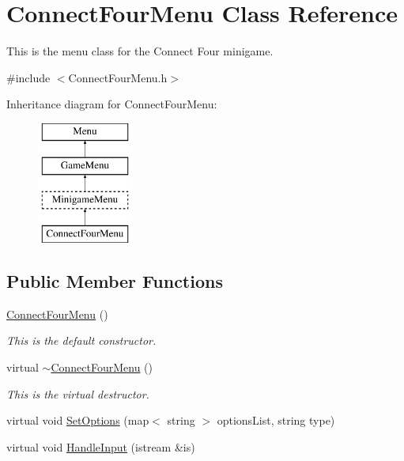 \hypertarget{classConnectFourMenu}{\section{Connect\-Four\-Menu Class Reference}
\label{classConnectFourMenu}
}


This is the menu class for the Connect Four minigame.  




{\ttfamily \#include $<$Connect\-Four\-Menu.\-h$>$}

Inheritance diagram for Connect\-Four\-Menu\-:\begin{figure}[H]
\begin{center}
\leavevmode
\includegraphics[height=4.000000cm]{classConnectFourMenu}
\end{center}
\end{figure}
\subsection*{Public Member Functions}
\begin{DoxyCompactItemize}
\item 
\hyperlink{classConnectFourMenu_a368513cbf367d7014e664667dbbb94ae}{Connect\-Four\-Menu} ()
\begin{DoxyCompactList}\small\item\em This is the default constructor. \end{DoxyCompactList}\item 
virtual \hyperlink{classConnectFourMenu_a48ee1e8fee0de22d72afb57571b0ac88}{$\sim$\-Connect\-Four\-Menu} ()
\begin{DoxyCompactList}\small\item\em This is the virtual destructor. \end{DoxyCompactList}\item 
virtual void \hyperlink{classConnectFourMenu_ae347bebdfd041aef13ba9bebca041037}{Set\-Options} (map$<$ string $>$ options\-List, string type)
\item 
virtual void \hyperlink{classConnectFourMenu_af99e9997dd1d477442181448cd6925ee}{Handle\-Input} (istream \&is)
\end{DoxyCompactItemize}
